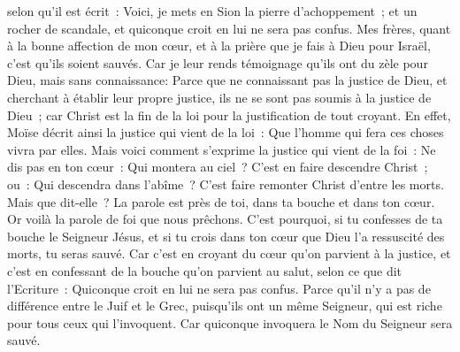 \begin{multicols}{2}
selon qu'il est écrit~: Voici, je mets en Sion la pierre d'achoppement~; et un rocher de scandale, et quiconque croit en lui ne sera pas confus.
\VerseOne{}Mes frères, quant à la bonne affection de mon cœur, et à la prière que je fais à Dieu pour Israël, c'est qu'ils soient sauvés.
Car je leur rends témoignage qu'ils ont du zèle pour Dieu, mais sans connaissance:
Parce que ne connaissant pas la justice de Dieu, et cherchant à établir leur propre justice, ils ne se sont pas soumis à la justice de Dieu~;
car Christ est la fin de la loi pour la justification de tout croyant.
En effet, Moïse décrit ainsi la justice qui vient de la loi~: Que l'homme qui fera ces choses vivra par elles.
Mais voici comment s'exprime la justice qui vient de la foi~: Ne dis pas en ton cœur~: Qui montera au ciel~? C'est en faire descendre Christ~;
ou~: Qui descendra dans l'abîme~? C'est faire remonter Christ d'entre les morts.
Mais que dit-elle~? La parole est près de toi, dans ta bouche et dans ton cœur. Or voilà la parole de foi que nous prêchons.
C'est pourquoi, si tu confesses de ta bouche le Seigneur Jésus, et si tu crois dans ton cœur que Dieu l'a ressuscité des morts, tu seras sauvé.
Car c'est en croyant du cœur qu'on parvient à la justice, et c'est en confessant de la bouche qu'on parvient au salut, selon ce que dit l'Ecriture~:
Quiconque croit en lui ne sera pas confus.
Parce qu'il n'y a pas de différence entre le Juif et le Grec, puisqu'ils ont un même Seigneur, qui est riche pour tous ceux qui l'invoquent.
Car quiconque invoquera le Nom du Seigneur sera sauvé.

\end{multicols}
